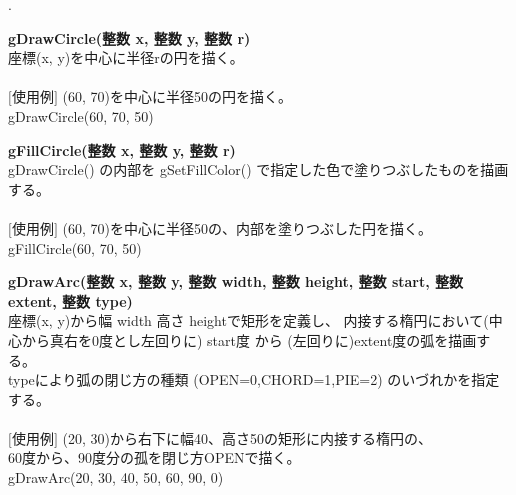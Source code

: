 \documentclass[11pt,a4j]{jarticle}
\newcounter{enum2}
\newenvironment{enumerate2}{%
   \begin{list}%
   {%
      \arabic{enum2}.\ \,%
   }%
   {%
      \usecounter{enum2}
      \setlength{\itemindent}{0zw}%
      \setlength{\leftmargin}{3zw}%
      \setlength{\rightmargin}{0zw}%
      \setlength{\labelsep}{0zw}%
      \setlength{\labelwidth}{3zw}%
      \setlength{\itemsep}{0em}%
      \setlength{\parsep}{0em}%
      \setlength{\listparindent}{0zw}%
   }
}{%
   \end{list}%
}
\begin{document}
\begin{enumerate2}
\item {\bf{gDrawCircle(整数 x, 整数 y, 整数 r)}} \\
       座標(x, y)を中心に半径rの円を描く。 \\
\ \\
	 \hspace{10pt}  $[$使用例$]$  (60, 70)を中心に半径50の円を描く。 \\
         \hspace{55pt}      gDrawCircle(60, 70, 50) \\

\item {\bf{gFillCircle(整数 x, 整数 y, 整数 r)}} \\
       gDrawCircle() の内部を gSetFillColor() で指定した色で塗りつぶしたものを描画する。 \\
\ \\
	 \hspace{10pt}  $[$使用例$]$ (60, 70)を中心に半径50の、内部を塗りつぶした円を描く。 \\
         \hspace{55pt}      gFillCircle(60, 70, 50) \\

\item {\bf{gDrawArc(整数 x, 整数 y, 整数 width, 整数 height, 整数 start, 整数 extent, 整数 type)}} \\
       座標(x, y)から幅 width 高さ heightで矩形を定義し、
       内接する楕円において(中心から真右を0度とし左回りに) 
       start度 から (左回りに)extent度の弧を描画する。\\
       typeにより弧の閉じ方の種類 (OPEN=0,CHORD=1,PIE=2)
       のいづれかを指定する。 \\
\ \\
	 \hspace{10pt}  $[$使用例$]$ (20, 30)から右下に幅40、高さ50の矩形に内接する楕円の、\\
         \hspace{55pt}  60度から、90度分の孤を閉じ方OPENで描く。 \\
         \hspace{55pt}     gDrawArc(20, 30, 40, 50, 60, 90, 0) \\


\end{enumerate2}
\end{document}
